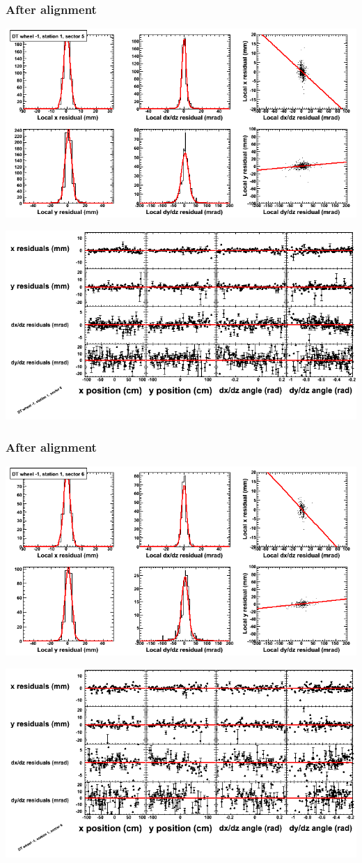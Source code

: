 \documentclass[compress]{beamer}
\begin{document}
\begin{frame}
\frametitle{After alignment}
\includegraphics[width=0.7\linewidth]{NOV4_fitfunctions/MBwhBst1sec05_bellcurves.png}

\includegraphics[width=0.7\linewidth]{NOV4_fitfunctions/MBwhBst1sec05_polynomials.png}
\end{frame}

\begin{frame}
\frametitle{After alignment}
\includegraphics[width=0.7\linewidth]{NOV4_fitfunctions/MBwhBst1sec06_bellcurves.png}

\includegraphics[width=0.7\linewidth]{NOV4_fitfunctions/MBwhBst1sec06_polynomials.png}
\end{frame}
\end{document}
